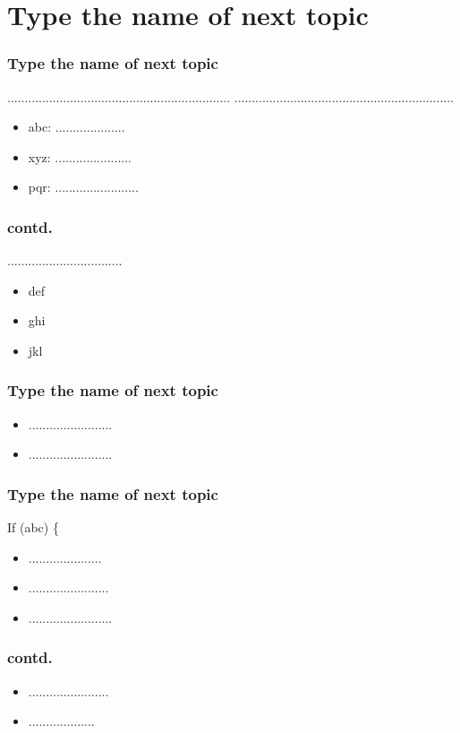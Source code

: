 \documentclass[]{beamer}
\begin{document}
\section{Type the name of next topic}
\begin{frame}
\frametitle{Type the name of next topic}
................................................................
...............................................................
\begin{itemize}
\item<1-> abc: .................... 
\item<2->xyz: ......................
\item<3->pqr: ........................ 
\end{itemize}
\end{frame}
\begin{frame}
\frametitle{contd.}
.................................
\begin{itemize}
\item<1-> def 
\item<2-> ghi
\item<3-> jkl
\end{itemize}
\end{frame}

\begin{frame}
\frametitle{Type the name of next topic}
\begin{itemize}
\item ........................
\item ........................
\end{itemize}
\end{frame}

\begin{frame}
\frametitle{Type the name of next topic}
If (abc) \{
\begin{itemize}
\item<1-> ..................... 
\item<2-> .......................
\item<3-> ........................
\end{itemize}
\end{frame}

\begin{frame}
\frametitle{contd.}
\begin{itemize}
\item<1-> .......................
\item<2-> ...................
\end{itemize}
\end{frame}
\end{document}
